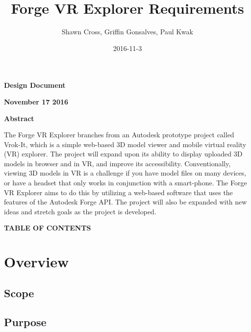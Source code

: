 \documentclass[letterpaper, 10pt, draftclsnofoot, compsoc, onecolumn]{IEEEtran}
\title{Forge VR Explorer Requirements}
\author{Shawn Cross, Griffin Gonsalves, Paul Kwak}
\date{2016-11-3}
\begin{document}
\clearpage\setcounter{page}{1}\pagestyle{Standard}
\thispagestyle{FirstPage}

\bigskip

{\centering{}\bfseries\color{black}
Design Document
\par}


\bigskip

{\centering{}\bfseries\color{black}
November 17 2016
\par}
\bigskip
\bigskip
\bigskip
\bigskip
\bigskip
\bigskip
\bigskip
\bigskip
\bigskip
\bigskip
\bigskip
\bigskip


\vfill
{\centering{}\bfseries\color{black}
Abstract
\par}

{\centering{}\mdseries\color{black}
	The Forge VR Explorer branches from an Autodesk prototype project called Vrok-It, which is a simple web-based 3D 
	model viewer and mobile virtual reality (VR) explorer. The project will expand upon its ability to display uploaded 3D 
	models in browser and in VR, and improve its accessibility. Conventionally, viewing 3D models in VR is a challenge if 
	you have model files on many devices, or have a headset that only works in conjunction with a smart-phone. The 
	Forge VR Explorer aims to do this by utilizing a web-based software that uses the features of the Autodesk Forge API. 
	The project will also be expanded with new ideas and stretch goals as the project is developed.
\par}
\clearpage
{\centering{}\bfseries\color{black}
TABLE OF CONTENTS
\par}

\bigskip

\setcounter{tocdepth}{2}
\renewcommand\contentsname{}
\tableofcontents

\bigskip
\clearpage


\section{Overview}

\subsection{Scope}

\subsection{Purpose}
\end{document}
